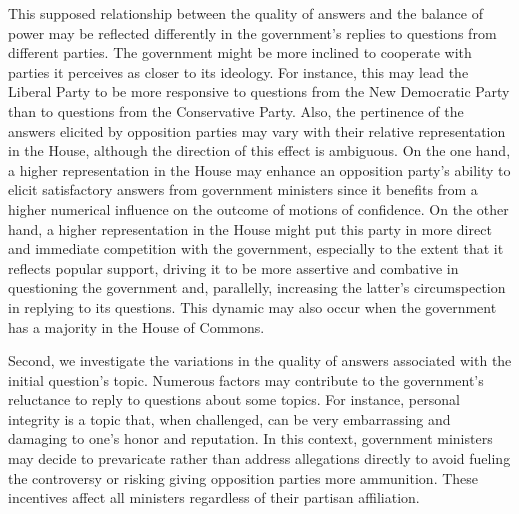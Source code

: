 {{This supposed relationship between the quality of answers and the balance of power may be reflected differently in the government’s replies to questions from different parties. The government might be more inclined to cooperate with parties it perceives as closer to its ideology. For instance, this may lead the Liberal Party to be more responsive to questions from the New Democratic Party than to questions from the Conservative Party. Also, the pertinence of the answers elicited by opposition parties may vary with their relative representation in the House, although the direction of this effect is ambiguous. On the one hand, a higher representation in the House may enhance an opposition party’s ability to elicit satisfactory answers from government ministers since it benefits from a higher numerical influence on the outcome of motions of confidence. On the other hand, a higher representation in the House might put this party in more direct and immediate competition with the government, especially to the extent that it reflects popular support, driving it to be more assertive and combative in questioning the government and, parallelly, increasing the latter’s circumspection in replying to its questions. This dynamic may also occur when the government has a majority in the House of Commons.

Second, we investigate the variations in the quality of answers associated with the initial question’s topic. Numerous factors may contribute to the government’s reluctance to reply to questions about some topics. For instance, personal integrity is a topic that, when challenged, can be very embarrassing and damaging to one's honor and reputation. In this context, government ministers may decide to prevaricate rather than address allegations directly to avoid fueling the controversy or risking giving opposition parties more ammunition. These incentives affect all ministers regardless of their partisan affiliation.

}}

